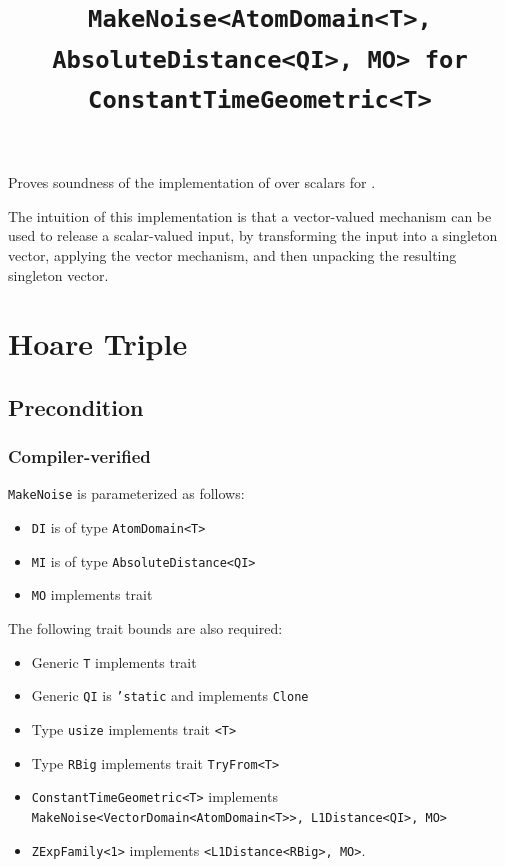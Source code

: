 \documentclass{article}
\title{\texttt{MakeNoise<AtomDomain<T>, AbsoluteDistance<QI>, MO> for ConstantTimeGeometric<T>}}
\author{\MichaelShoemateAuthor}
\date{}
\begin{document}
\maketitle

\contrib
Proves soundness of the implementation of  over scalars
for .

The intuition of this implementation is that a vector-valued mechanism can be used to release a scalar-valued input,
by transforming the input into a singleton vector,
applying the vector mechanism, and then unpacking the resulting singleton vector.

\section{Hoare Triple}
\subsection*{Precondition}
\subsubsection*{Compiler-verified}

\texttt{MakeNoise} is parameterized as follows:
\begin{itemize}
    \item \texttt{DI} is of type \texttt{AtomDomain<T>}
    \item \texttt{MI} is of type \texttt{AbsoluteDistance<QI>}
    \item \texttt{MO} implements trait 
\end{itemize}

The following trait bounds are also required:
\begin{itemize}
    \item Generic \texttt{T} implements trait 
    \item Generic \texttt{QI} is \texttt{'static} and implements \texttt{Clone}
    \item Type \texttt{usize} implements trait \texttt{<T>}
    \item Type \texttt{RBig} implements trait \texttt{TryFrom<T>}
    \item \texttt{ConstantTimeGeometric<T>} implements \texttt{MakeNoise<VectorDomain<AtomDomain<T>>, L1Distance<QI>, MO>}
    \item \texttt{ZExpFamily<1>} implements \texttt{<L1Distance<RBig>, MO>}.
\end{itemize}
\end{document}

